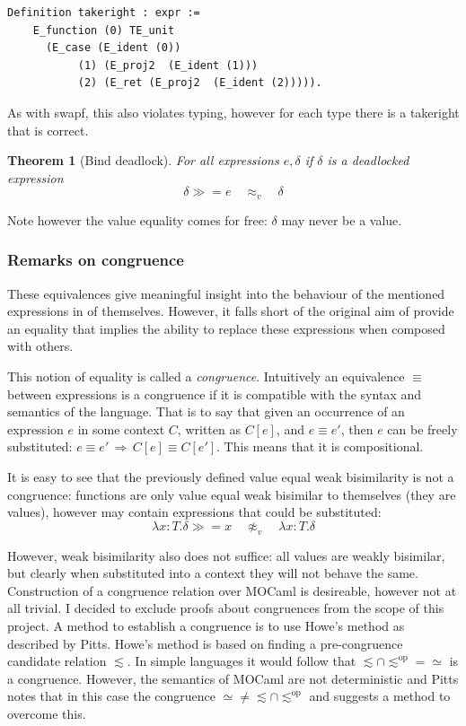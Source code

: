 \documentclass[12pt,twoside,notitlepage]{report}
\theoremstyle{plain}%
\newtheorem{thm}{Theorem}[section]
\theoremstyle{definition}
\theoremstyle{remark}
\begin{document}
\begin{lstlisting}[language={Coq}, caption={takeright operator}, label={lst:takeright_op}]
Definition takeright : expr :=
    E_function (0) TE_unit 
      (E_case (E_ident (0)) 
           (1) (E_proj2  (E_ident (1))) 
           (2) (E_ret (E_proj2  (E_ident (2))))).
\end{lstlisting}

As with swapf, this also violates typing, however for each type there is a takeright that is correct.

\begin{thm}[Bind deadlock]
For all expressions $ e, \delta$ if $ \delta $ is a deadlocked expression
\[  \delta \gg= e\quad \approx_v \quad \delta \]
\end{thm}

Note however the value equality comes for free: $ \delta $ may never be a value.

\subsubsection{Remarks on congruence}

These equivalences give meaningful insight into the behaviour of the mentioned expressions in of themselves. However, it falls short of the original aim of provide an equality that implies the ability to replace these expressions when composed with others. 

This notion of equality is called a \textit{congruence}. Intuitively an equivalence $ \equiv $ between expressions is a congruence if it is compatible with the syntax and semantics of the language. That is to say that given an occurrence of an expression $ e $ in some context $ C $, written as $ C[e] $, and $ e \equiv e' $, then $ e $ can be freely substituted: $e \equiv e'\, \Rightarrow\, C[e]\equiv C[e'] $. This means that it is compositional.

It is easy to see that the previously defined value equal weak bisimilarity is not a congruence: functions are only  value equal weak bisimilar to themselves (they are values), however may contain expressions that could be substituted:
\[ \lambda x : T. \delta \gg= x\quad \not\approx_v \quad \lambda x : T.\delta \]

However, weak bisimilarity also does not suffice: all values are weakly bisimilar, but clearly when substituted into a context they will not behave the same. 
Construction of a congruence relation over MOCaml is desireable, however not at all trivial. I decided to exclude proofs about congruences from the scope of this project. A method to establish a congruence is to use Howe's method\cite{howe1996proving} as described by Pitts\cite{pitts2011howe}. Howe's method is based on finding a pre-congruence candidate relation $ \lesssim $. In simple languages it would follow that $ \lesssim \cap \lesssim^{\text{op}} = \simeq $ is a congruence. However, the semantics of MOCaml are not deterministic and Pitts notes that in this case the congruence $  \simeq \neq \lesssim \cap \lesssim^{\text{op}} $ and suggests a method to overcome this. 
\end{document}
